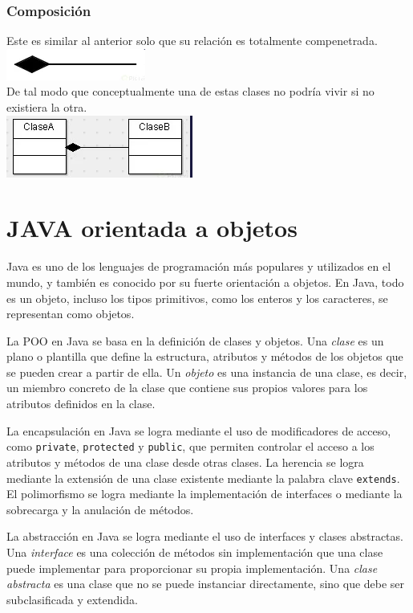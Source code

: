 \documentclass[executivepaper]{article}
\begin{document}
\subsubsection{Composición}
Este es similar al anterior solo que su relación es totalmente compenetrada.\\
\includegraphics[scale=0.5]{2.8.png}\\
De tal modo que conceptualmente una de estas clases no podría vivir si no existiera la otra.\\
\includegraphics[scale=0.5]{2.9.png}\\

\newpage
\section{JAVA orientada a objetos}
Java es uno de los lenguajes de programación más populares y utilizados en el mundo, y también es conocido por su fuerte orientación a objetos. En Java, todo es un objeto, incluso los tipos primitivos, como los enteros y los caracteres, se representan como objetos.

La POO en Java se basa en la definición de clases y objetos. Una \textit{clase} es un plano o plantilla que define la estructura, atributos y métodos de los objetos que se pueden crear a partir de ella. Un \textit{objeto} es una instancia de una clase, es decir, un miembro concreto de la clase que contiene sus propios valores para los atributos definidos en la clase.

La encapsulación en Java se logra mediante el uso de modificadores de acceso, como \texttt{private}, \texttt{protected} y \texttt{public}, que permiten controlar el acceso a los atributos y métodos de una clase desde otras clases. La herencia se logra mediante la extensión de una clase existente mediante la palabra clave \texttt{extends}. El polimorfismo se logra mediante la implementación de interfaces o mediante la sobrecarga y la anulación de métodos.

La abstracción en Java se logra mediante el uso de interfaces y clases abstractas. Una \textit{interface} es una colección de métodos sin implementación que una clase puede implementar para proporcionar su propia implementación. Una \textit{clase abstracta} es una clase que no se puede instanciar directamente, sino que debe ser subclasificada y extendida.
\end{document}
